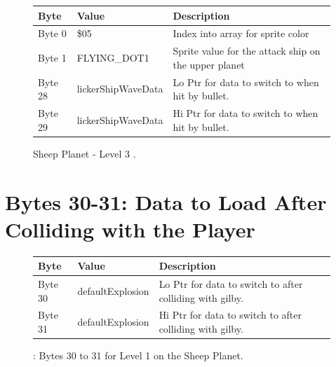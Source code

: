 \begin{figure}[H]
  {
  \setlength{\tabcolsep}{3.0pt}
  \setlength\cmidrulewidth{\heavyrulewidth} %
  \begin{adjustbox}{width=12cm}

\begin{tabular}{lll}
\toprule
 Byte    & Value                     & Description                                                        \\
\midrule
 Byte 0  & \$05                       & Index into array for sprite color                                  \\
 Byte 1  & FLYING\_DOT1               & Sprite value for the attack ship on the upper planet\index{planet}               \\
 Byte 28 & lickerShipWaveData\index{lickerShipWaveData}         & Lo Ptr for data to switch to when hit by bullet.                                    \\
 Byte 29 & lickerShipWaveData\index{lickerShipWaveData}         & Hi Ptr for data to switch to when hit by bullet.                                    \\
\bottomrule
\end{tabular}

  \end{adjustbox}

  }\caption{Sheep Planet - Level 3
.}
\end{figure}

\section{Bytes 30-31: Data to Load After Colliding with the Player}
\begin{figure}[H]

  {
    \setlength{\tabcolsep}{3.0pt}
    \setlength\cmidrulewidth{\heavyrulewidth} %
    \begin{adjustbox}{width=13cm}

      \begin{tabular}{lll}
        \toprule
        Byte    & Value                     & Description                                                        \\
        \midrule
 Byte 30 & defaultExplosion\index{defaultExplosion}          & Lo Ptr for data to switch to after colliding\index{colliding} with gilby.                \\
 Byte 31 & defaultExplosion\index{defaultExplosion}          & Hi Ptr for data to switch to after colliding\index{colliding} with gilby.                \\
        \bottomrule
      \end{tabular}
    \end{adjustbox}
  }\caption{: Bytes 30 to 31 for Level 1 on the Sheep Planet.}
\end{figure}

